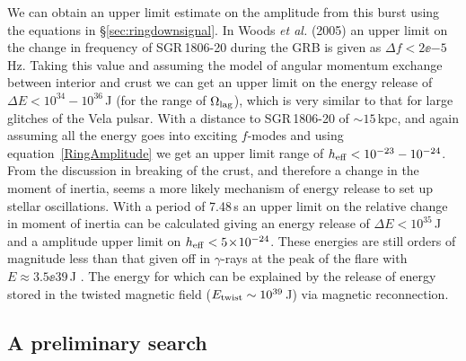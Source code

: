 We can obtain an upper limit estimate on the \gw amplitude from this burst using the equations in
\S\ref{sec:ringdownsignal}. In Woods {\it et al.} (2005) \cite{Woods:2005} an upper limit on the
change in frequency of SGR\,1806-20 during the GRB is given as $\Delta{}f < 2\ee{-5}$\,Hz. Taking
this value and assuming the model of angular momentum exchange between interior and crust we can get
an upper limit on the energy release of $\Delta{}E < 10^{34}-10^{36}$\,J (for the range of
$\Omega_{\rm lag}$), which is very similar to that for large glitches of the Vela pulsar. With a
distance to SGR\,1806-20 of $\sim 15$\,kpc, and again assuming all the energy goes into exciting
$f$-modes and using equation~\ref{RingAmplitude} we get an upper limit range of $h_{\rm eff} <
10^{-23}-10^{-24}$. From the discussion in \cite{Hurley:2005} breaking of the crust, and therefore a
change in the moment of inertia, seems a more likely mechanism of energy release to set up stellar
oscillations. With a period of 7.48\,s an upper limit on the relative change in moment of inertia
can be calculated giving an energy release of $\Delta{}E < 10^{35}$\,J and a \gw amplitude upper
limit on $h_{\rm eff} < 5\!\times\!10^{-24}$. These energies are still orders of magnitude less than that
given off in $\gamma$-rays at the peak of the flare with $E \approx 3.5\ee{39}$\,J
\cite{Hurley:2005}. The energy for which can be explained by the release of energy stored in the
twisted magnetic field ($E_{\rm twist} \sim 10^{39}$\,J) via magnetic reconnection. 

\subsection{A preliminary search}

